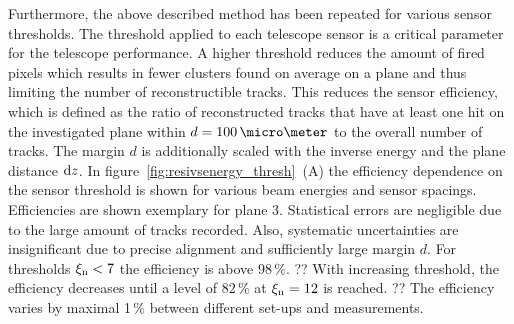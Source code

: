 Furthermore, the above described method has been repeated for various sensor thresholds.
The threshold applied to each telescope sensor is a critical parameter for the telescope performance.
A higher threshold reduces the amount of fired pixels which results in fewer clusters found on average on a plane and thus limiting the number of reconstructible tracks.
This reduces the sensor efficiency, which is defined as the ratio of reconstructed tracks that have at least one hit on the investigated plane within $d = 100\,\micro\meter$ to the overall number of tracks.
The margin $d$ is additionally scaled with the inverse energy and the plane distance $\textrm{d}z$. 
In figure~\ref{fig:resivsenergy_thresh}~(A) the efficiency dependence on the sensor threshold is shown for various beam energies and sensor spacings.
Efficiencies are shown exemplary for plane 3. 
Statistical errors are negligible due to the large amount of tracks recorded.
Also, systematic uncertainties are insignificant due to precise alignment and sufficiently large margin $d$.  
For thresholds $\xi_{\textrm{n}} < 7$ the efficiency is above $98\,\%$. ??
With increasing threshold, the efficiency decreases until a level of $82\,\%$ at $\xi_{\textrm{n}} = 12$ is reached. ??
The efficiency varies by maximal 1\,\% between different set-ups and measurements. 


